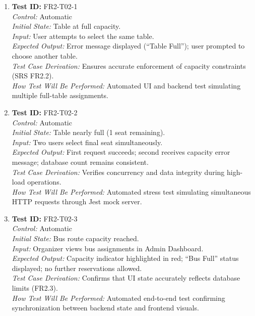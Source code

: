 \documentclass[12pt, titlepage]{article}
\begin{document}
\begin{enumerate}\setlength{\itemsep}{1em}
    \item \textbf{Test ID:} FR2-T02-1\\[0.5em]
    \textit{Control:} Automatic\\[0.3em]
    \textit{Initial State:} Table at full capacity.\\[0.3em]
    \textit{Input:} User attempts to select the same table.\\[0.3em]
    \textit{Expected Output:} Error message displayed (“Table Full”); user prompted to choose another table.\\[0.3em]
    \textit{Test Case Derivation:} Ensures accurate enforcement of capacity constraints (SRS FR2.2).\\[0.3em]
    \textit{How Test Will Be Performed:} Automated UI and backend test simulating multiple full-table assignments.

    \item \textbf{Test ID:} FR2-T02-2\\[0.5em]
    \textit{Control:} Automatic\\[0.3em]
    \textit{Initial State:} Table nearly full (1 seat remaining).\\[0.3em]
    \textit{Input:} Two users select final seat simultaneously.\\[0.3em]
    \textit{Expected Output:} First request succeeds; second receives capacity error message; database count remains consistent.\\[0.3em]
    \textit{Test Case Derivation:} Verifies concurrency and data integrity during high-load operations.\\[0.3em]
    \textit{How Test Will Be Performed:} Automated stress test simulating simultaneous HTTP requests through Jest mock server.

    \item \textbf{Test ID:} FR2-T02-3\\[0.5em]
    \textit{Control:} Automatic\\[0.3em]
    \textit{Initial State:} Bus route capacity reached.\\[0.3em]
    \textit{Input:} Organizer views bus assignments in Admin Dashboard.\\[0.3em]
    \textit{Expected Output:} Capacity indicator highlighted in red; “Bus Full” status displayed; no further reservations allowed.\\[0.3em]
    \textit{Test Case Derivation:} Confirms that UI state accurately reflects database limits (FR2.3).\\[0.3em]
    \textit{How Test Will Be Performed:} Automated end-to-end test confirming synchronization between backend state and frontend visuals.
\end{enumerate}
\end{document}

